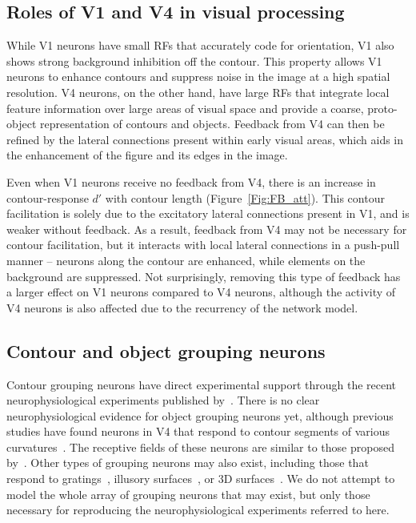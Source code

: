 \subsection{Roles of V1 and V4 in visual processing}

While V1 neurons have small RFs that accurately code for orientation, V1 also shows strong
background inhibition off the contour. This property allows V1 neurons
to enhance contours and suppress noise in the image at a high spatial
resolution. V4 neurons, on the other hand, have large RFs that integrate
local feature information over large areas of visual space and provide
a coarse, proto-object representation of contours and objects.
Feedback from V4 can then be refined by the lateral connections present
within early visual areas, which aids in the enhancement of the figure
and its edges in the image.

Even when V1 neurons receive no feedback from V4, there is an
increase in contour-response $d'$ with contour length
(Figure~\ref{Fig:FB_att}). This contour facilitation is solely due to
the excitatory lateral connections present in V1, and is weaker
without feedback. As a result, feedback from V4 may not be necessary
for contour facilitation, but it interacts with local lateral
connections in a push-pull manner -- neurons along the contour are
enhanced, while elements on the background are suppressed. Not
surprisingly, removing this type of feedback has a larger effect on V1
neurons compared to V4 neurons, although the activity of V4 neurons is
also affected due to the recurrency of the network model.

\subsection{Contour and object grouping neurons}

Contour grouping neurons have direct experimental support through the
recent neurophysiological experiments published by~\cite{Chen_etal14}.
There is no clear neurophysiological evidence for object grouping
neurons yet, although previous studies have found neurons in V4 that
respond to contour segments of various
curvatures~\citep{Pasupathy_Connor02,Brincat_Connor04}. The receptive
fields of these neurons are similar to those proposed
 by~\cite{Craft_etal07}. Other types of grouping neurons may also exist,
including those that respond to gratings~\citep{Hegde_vanEssen07},
illusory surfaces~\citep{Cox_etal13}, or 3D
surfaces~\citep{He_Nakayama95,Hu_etal15a}.  We do not attempt to model
the whole array of grouping neurons that may exist, but only those
necessary for reproducing the neurophysiological experiments referred
to here.

